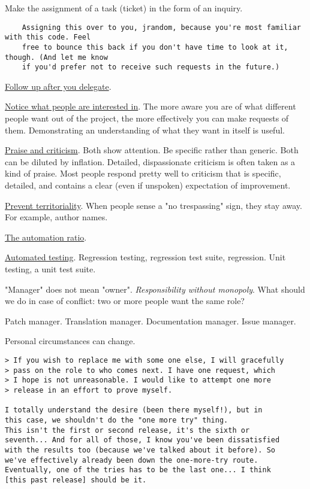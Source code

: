 \documentclass[landscape,30pt]{foils}
\begin{document}
Make the assignment of a task (ticket) in the form of an inquiry.

{\tiny
\begin{verbatim}
    Assigning this over to you, jrandom, because you're most familiar with this code. Feel
    free to bounce this back if you don't have time to look at it, though. (And let me know
    if you'd prefer not to receive such requests in the future.)
\end{verbatim}
}

\underline{Follow up after you delegate}.

\underline{Notice what people are interested in}.  The more aware you are of what different people want out of the project, the more effectively you can make requests of them.  Demonstrating an understanding of what they want in itself is useful.

\underline{Praise and criticism}.  Both show attention.  Be specific rather than generic.  Both can be diluted by inflation.  Detailed, dispassionate criticism is often taken as a kind of praise.  Most people respond pretty well to criticism that is specific,
detailed, and contains a clear (even if unspoken) expectation of improvement.

\underline{Prevent territoriality}.  When people sense a "no trespassing" sign, they stay away.  For example, author names.

\underline{The automation ratio}.

\underline{Automated testing}.  Regression testing, regression test suite, regression.  Unit testing, a unit test suite.



"Manager" does not mean "owner".  {\em Responsibility without monopoly}.  What should we do in case of conflict: two or more people want the same role?

Patch manager. Translation manager.  Documentation manager.  Issue manager.     



Personal circumstances can change.

{\tiny
\begin{verbatim}
> If you wish to replace me with some one else, I will gracefully
> pass on the role to who comes next. I have one request, which
> I hope is not unreasonable. I would like to attempt one more
> release in an effort to prove myself.

I totally understand the desire (been there myself!), but in
this case, we shouldn't do the "one more try" thing.
This isn't the first or second release, it's the sixth or
seventh... And for all of those, I know you've been dissatisfied
with the results too (because we've talked about it before). So
we've effectively already been down the one-more-try route.
Eventually, one of the tries has to be the last one... I think
[this past release] should be it.
\end{verbatim}
}
\end{document}
